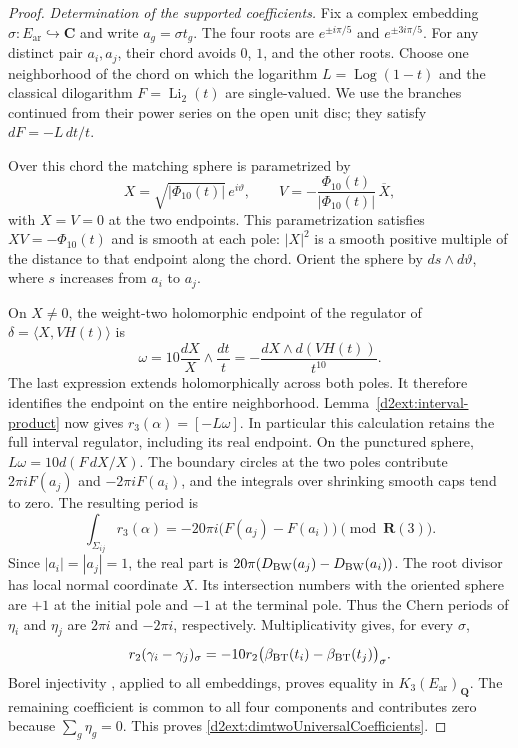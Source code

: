 \documentclass[11pt,a4paper]{amsart}
\numberwithin{equation}{section}
\theoremstyle{definition}
\theoremstyle{remark}
\begin{document}
\begin{proof}
\emph{Determination of the supported coefficients.}
Fix a complex embedding $\sigma:E_{\mathrm{ar}}\hookrightarrow\mathbf C$ and
write $a_g=\sigma t_g$. The four roots are
$e^{\pm i\pi/5}$ and $e^{\pm3i\pi/5}$. For any distinct pair
$a_i,a_j$, their chord avoids $0$, $1$, and the other roots. Choose
one neighborhood of the chord on which the logarithm
$L=\operatorname{Log}(1-t)$ and the classical dilogarithm
$F=\operatorname{Li}_2(t)$ are single-valued. We use the branches
continued from their power series on the open unit disc; they satisfy
$dF=-L\,dt/t$.

Over this chord the matching sphere is parametrized by
\[
 X=\sqrt{|\Phi_{10}(t)|}\,e^{i\vartheta},\qquad
 V=-\frac{\Phi_{10}(t)}{|\Phi_{10}(t)|}\,\overline X,
\]
with $X=V=0$ at the two endpoints. This parametrization satisfies
$XV=-\Phi_{10}(t)$ and is smooth at each pole: $|X|^2$ is a
smooth positive multiple of the distance to that endpoint along
the chord. Orient the sphere by $ds\wedge d\vartheta$, where $s$
increases from $a_i$ to $a_j$.

On $X\ne0$, the weight-two holomorphic endpoint of the regulator
of $\delta=\langle X,VH(t)\rangle$ is
\[
 \omega=10\frac{dX}{X}\wedge\frac{dt}{t}
        =-\frac{dX\wedge d(VH(t))}{t^{10}}.
\]
The last expression extends holomorphically across both poles.
It therefore identifies the endpoint on the entire neighborhood.
Lemma~\ref{d2ext:interval-product} now gives
$r_3(\alpha)=[-L\omega]$. In particular this calculation retains
the full interval regulator, including its real endpoint.
On the punctured sphere,
$L\omega=10d(F\,dX/X)$. The boundary circles at the two poles
contribute $2\pi iF(a_j)$ and $-2\pi iF(a_i)$, and the integrals
over shrinking smooth caps tend to zero. The resulting period is
\begin{equation}\label{d2ext:matching-period}
 \int_{\Sigma_{ij}}r_3(\alpha)
   =-20\pi i\bigl(F(a_j)-F(a_i)\bigr)
       \pmod{\mathbf R(3)}.
\end{equation}
Since $|a_i|=|a_j|=1$, the real part is
$20\pi(D_{\rm BW}(a_j)-D_{\rm BW}(a_i))$.
The root divisor has local normal coordinate $X$. Its intersection
numbers with the oriented sphere are $+1$ at the initial pole
and $-1$ at the terminal pole. Thus the Chern periods of
$\eta_i$ and $\eta_j$ are $2\pi i$ and $-2\pi i$, respectively.
Multiplicativity gives, for every $\sigma$,
\[
 r_2(\gamma_i-\gamma_j)_\sigma
   =-10r_2\bigl(\beta_{\rm BT}(t_i)-\beta_{\rm BT}(t_j)\bigr)_\sigma.
\]
Borel injectivity \cite[Section~6]{BunkeTamme}, applied to all
embeddings, proves equality in $K_3(E_{\mathrm{ar}})_{\mathbf Q}$. The remaining coefficient is common to
all four components and contributes zero because $\sum_g\eta_g=0$.
This proves \eqref{d2ext:dimtwoUniversalCoefficients}.


\end{proof}
\end{document}

